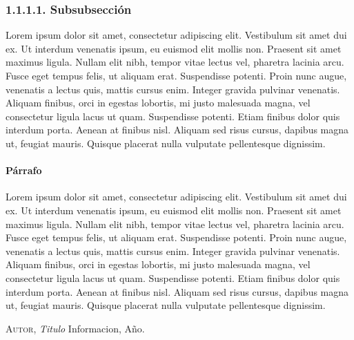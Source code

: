 \documentclass[a4paper,openright,12pt]{report}
\begin{document}
\subsubsection*{1.1.1.1. Subsubsección}

Lorem ipsum dolor sit amet, consectetur adipiscing elit. Vestibulum sit amet dui ex. Ut interdum venenatis ipsum, eu euismod elit mollis non. Praesent sit amet maximus ligula. Nullam elit nibh, tempor vitae lectus vel, pharetra lacinia arcu. Fusce eget tempus felis, ut aliquam erat. Suspendisse potenti. Proin nunc augue, venenatis a lectus quis, mattis cursus enim. Integer gravida pulvinar venenatis. Aliquam finibus, orci in egestas lobortis, mi justo malesuada magna, vel consectetur ligula lacus ut quam. Suspendisse potenti. Etiam finibus dolor quis interdum porta. Aenean at finibus nisl. Aliquam sed risus cursus, dapibus magna ut, feugiat mauris. Quisque placerat nulla vulputate pellentesque dignissim.

\paragraph{Párrafo}

Lorem ipsum dolor sit amet, consectetur adipiscing elit. Vestibulum sit amet dui ex. Ut interdum venenatis ipsum, eu euismod elit mollis non. Praesent sit amet maximus ligula. Nullam elit nibh, tempor vitae lectus vel, pharetra lacinia arcu. Fusce eget tempus felis, ut aliquam erat. Suspendisse potenti. Proin nunc augue, venenatis a lectus quis, mattis cursus enim. Integer gravida pulvinar venenatis. Aliquam finibus, orci in egestas lobortis, mi justo malesuada magna, vel consectetur ligula lacus ut quam. Suspendisse potenti. Etiam finibus dolor quis interdum porta. Aenean at finibus nisl. Aliquam sed risus cursus, dapibus magna ut, feugiat mauris. Quisque placerat nulla vulputate pellentesque dignissim.

\cleardoublepage

\begin{thebibliography}{aaaa}

 \textsc{Autor},
\textit{Titulo} Informacion, Año. 

\end{thebibliography}
\end{document}
